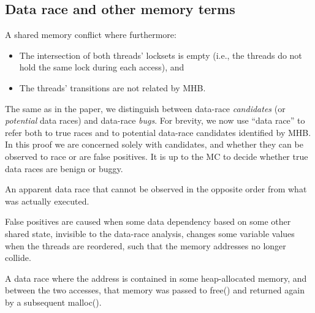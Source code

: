 
\subsection{Data race and other memory terms}

\begin{definition}
A shared memory conflict where furthermore:
\begin{itemize}
	\item The intersection of both threads' locksets is empty (i.e., the threads do not hold the same lock during each access), and
	\item The threads' transitions are not related by MHB.
\end{itemize}
\end{definition}

The same as in the paper, we distinguish between data-race {\em candidates} (or {\em potential} data races) and data-race {\em bugs}.
For brevity, we now use ``data race'' to refer both to true races and to potential data-race candidates identified by MHB.
In this proof we are concerned solely with candidates, and whether they can be observed to race or are false positives.
It is up to the MC to decide whether true data races are benign or buggy.

\begin{definition}
	An apparent data race that cannot be observed in the opposite order from what was actually executed.
\end{definition}

False positives are caused when some data dependency based on some other shared state, invisible to the data-race analysis,
changes some variable values when the threads are reordered, such that the memory addresses no longer collide.

\begin{definition}
	A data race where the address is contained in some heap-allocated memory, and between the two accesses, that memory was passed to free() and returned again by a subsequent malloc().
\end{definition}

